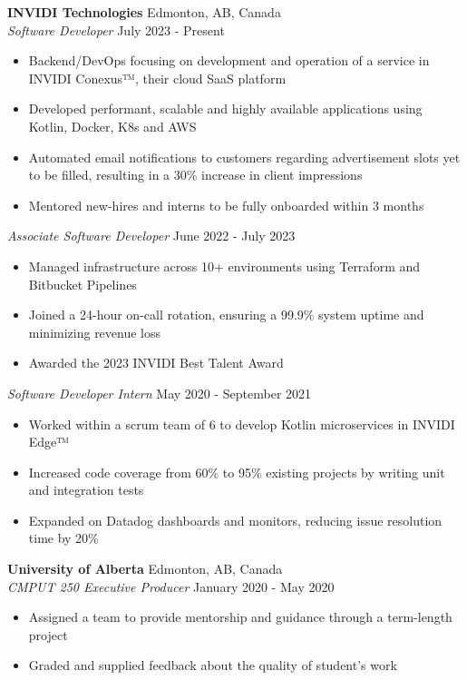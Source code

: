 \documentclass[a4paper]{article}
\begin{document}
\textbf{INVIDI Technologies} \hfill Edmonton, AB, Canada\\
\textit{Software Developer} \hfill July 2023 - Present\\
\vspace{-1mm}
\begin{itemize} \itemsep 1pt
	\item Backend/DevOps focusing on development and operation of a service in INVIDI Conexus™, their cloud SaaS platform
	\item Developed performant, scalable and highly available applications using Kotlin, Docker, K8s and AWS
	\item Automated email notifications to customers regarding advertisement slots yet to be filled, resulting in a 30\% increase in client impressions
    \item Mentored new-hires and interns to be fully onboarded within 3 months
\end{itemize}
\textit{Associate Software Developer} \hfill June 2022 - July 2023\\
\vspace{-1mm}
\begin{itemize} \itemsep 1pt
    \item Managed infrastructure across 10+ environments using Terraform and Bitbucket Pipelines
	\item Joined a 24-hour on-call rotation, ensuring a 99.9\% system uptime and minimizing revenue loss
    \item Awarded the 2023 INVIDI Best Talent Award
\end{itemize}
\textit{Software Developer Intern} \hfill May 2020 - September 2021\\
\vspace{-1mm}
\begin{itemize} \itemsep 1pt
	\item Worked within a scrum team of 6 to develop Kotlin microservices in INVIDI Edge™
	\item Increased code coverage from 60\% to 95\% existing projects by writing unit and integration tests
	\item Expanded on Datadog dashboards and monitors, reducing issue resolution time by 20\%
\end{itemize}
\textbf{University of Alberta} \hfill Edmonton, AB, Canada\\
\textit{CMPUT 250 Executive Producer} \hfill January 2020 - May 2020\\
\vspace{-1mm}
\begin{itemize} \itemsep 1pt
    \item Assigned a team to provide mentorship and guidance through a term-length project
	\item Graded and supplied feedback about the quality of student's work
\end{itemize}
\end{document}
